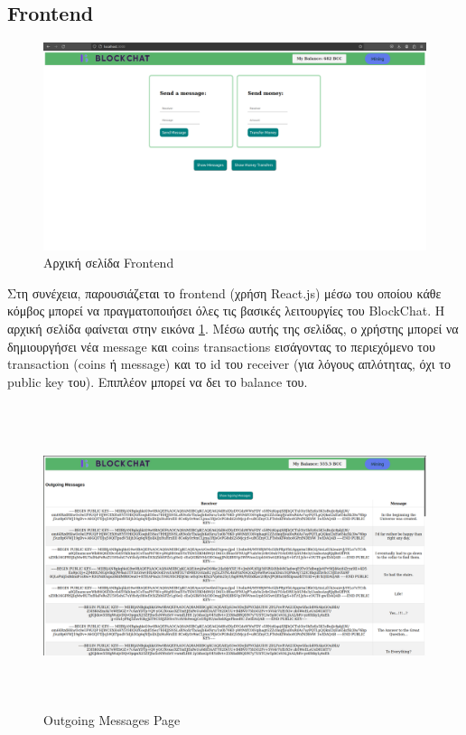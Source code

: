 \documentclass[12pt, a4paper]{article}
\begin{document}
\subsection{Frontend}
\begin{figure}[h!]
	\centering
	\includegraphics[width=7in]{sc1.png}
	\caption{Αρχική σελίδα Frontend}
	\label{fig:landingPage}
\end{figure}
\noindent
Στη συνέχεια, παρουσιάζεται το frontend (χρήση React.js) μέσω του οποίου κάθε κόμβος μπορεί να πραγματοποιήσει όλες τις βασικές λειτουργίες του BlockChat. Η αρχική σελίδα φαίνεται στην εικόνα \ref{fig:landingPage}. Μέσω αυτής της σελίδας, ο χρήστης μπορεί να δημιουργήσει νέα message και coins transactions εισάγοντας το περιεχόμενο του transaction (coins ή message) και το id του receiver (για λόγους απλότητας, όχι το public key του). Επιπλέον μπορεί να δει το balance του. 
\begin{figure}[h!]
	\centering
	\includegraphics[width=7in, height=3.5in]{sc4.png}
	\caption{Outgoing Messages Page}
	\label{fig:showMessages}
\end{figure}
\end{document}
